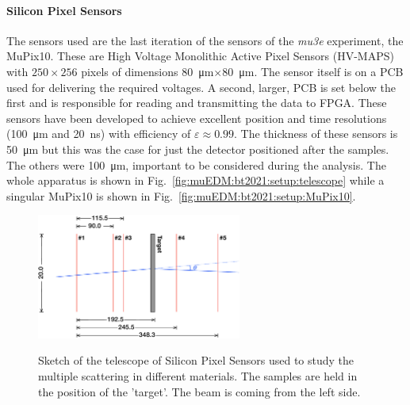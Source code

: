 \begin{refsection}
        \paragraph{Silicon Pixel Sensors}
        The sensors used are the last iteration of the sensors of the \textit{mu3e} experiment, the MuPix10. 
        These are High Voltage Monolithic Active Pixel Sensors (HV-MAPS) with $250\times256$ pixels of dimensions \SI{80}{\micro m}$\times$\SI{80}{\micro m}. 
        The sensor itself is on a PCB used for delivering the required voltages.
        A second, larger, PCB is set below the first and is responsible for reading and transmitting the data to FPGA.
        These sensors have been developed to achieve excellent position and time resolutions (\SI{100}{\micro m} and \SI{20}{ns}) with efficiency of $\varepsilon \approx 0.99$. 
        The thickness of these sensors is \SI{50}{\micro m} but this was the case for just the detector positioned after the samples. 
        The others were \SI{100}{\micro m}, important to be considered during the analysis.
        The whole apparatus is shown in Fig.~\ref{fig:muEDM:bt2021:setup:telescope} while a singular MuPix10 is shown in Fig.~\ref{fig:muEDM:bt2021:setup:MuPix10}.
        
        \begin{figure}
            \centering
            \includegraphics[width=0.6\textwidth]{Figures/muEDM_Dec2021/Positions_Telescope.png}\\
            \caption[muEDM 2021: sketch of the telescope]{Sketch of the telescope of Silicon Pixel Sensors used to study the multiple scattering in different materials.
            The samples are held in the position of the 'target'. 
            The beam is coming from the left side.}
            \label{fig:muEDM:bt2021:telescope}
        \end{figure}


\end{refsection}
